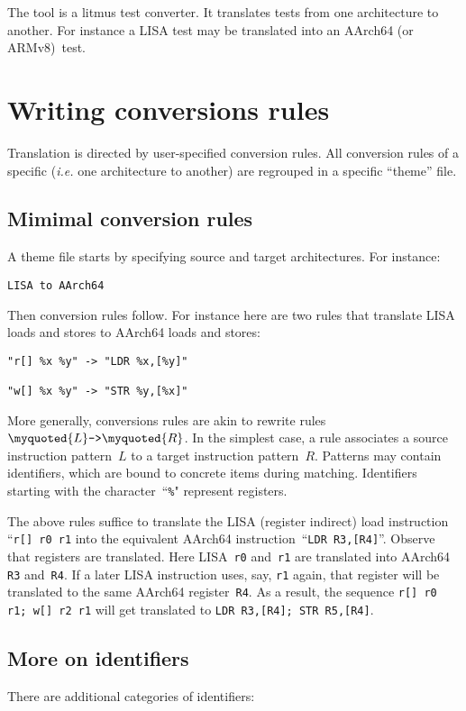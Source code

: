 
The tool \jingle{} is a litmus test converter.
It translates tests from one architecture to another.
For instance a LISA test may be translated into an AArch64 (or ARMv8)~test.


\section{Writing conversions rules}
Translation is directed by user-specified conversion rules.
All conversion rules of a specific (\emph{i.e.} one architecture
to another) are regrouped in a specific ``theme'' file.


\subsection{Mimimal conversion rules}
A theme file starts by specifying source and target architectures.
For instance:
\begin{verbatim}
LISA to AArch64
\end{verbatim}

Then conversion rules follow. For instance here are two rules
that translate LISA loads and stores to AArch64 loads and stores:
\begin{verbatim}
"r[] %x %y" -> "LDR %x,[%y]"

"w[] %x %y" -> "STR %y,[%x]"
\end{verbatim}
More generally, conversions rules are akin to rewrite
rules~$\myquoted{L} \texttt{->} \myquoted{R}$.
In the simplest case,
a rule associates a source instruction pattern~$L$
to a target instruction pattern~$R$.
Patterns may contain identifiers, which are bound to concrete items
during matching.
Identifiers starting with the character~``\verb+%+" represent registers.

The above rules suffice to translate the LISA (register indirect)
load instruction ``\verb+r[] r0 r1+
into the equivalent AArch64 instruction~``\verb+LDR R3,[R4]+''.
Observe that registers are translated.
Here LISA~\verb+r0+ and~\verb+r1+
are translated into  AArch64 \verb+R3+ and~\verb+R4+.
If a later LISA instruction uses, say, \verb+r1+ again,
that register will be translated to the same AArch64 register~\verb+R4+.
As a result, the sequence \verb+r[] r0 r1; w[] r2 r1+ will get
translated to \verb+LDR R3,[R4]; STR R5,[R4]+.


\subsection{More on identifiers}
There are additional categories of identifiers:

